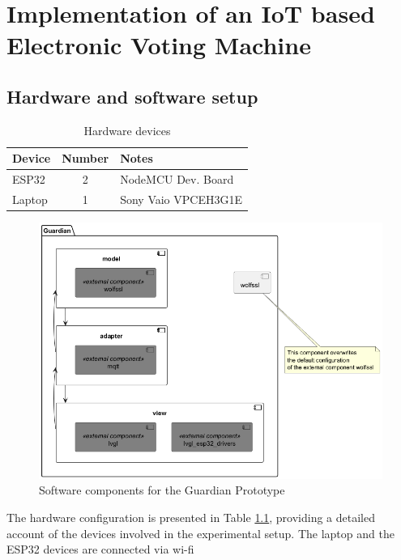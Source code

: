 \chapter{Implementation of an IoT based Electronic Voting Machine}

\section{Hardware and software setup}
\begin{table}[h!]
    \centering
    \begin{tabular}{|l|c|p{5cm}|}
        \hline
        \textbf{Device} & \textbf{Number} & \textbf{Notes} \\
        \hline
        ESP32 & 2 & NodeMCU Dev. Board \\
        \hline
        Laptop & 1 & Sony Vaio VPCEH3G1E \\
        \hline
    \end{tabular}
    \caption{Hardware devices}\label{tab:hardware-components}
\end{table}

\begin{figure}
	\centering
	\includegraphics[scale=.5]{abbildungen/Diagramme/components.png}
	\caption{Software components for the Guardian Prototype}\label{Fig:software-components} 
\end{figure}

The hardware configuration is presented in Table \ref{tab:hardware-components}, providing a detailed account of the devices involved in the experimental setup. The laptop and the ESP32 devices are connected via wi-fi 


